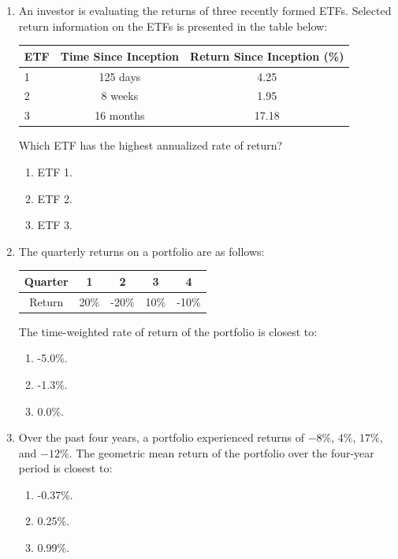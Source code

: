 \begin{enumerate}
	\item An investor is evaluating the returns of three recently formed ETFs. Selected return information on the ETFs is presented in the table below:
	      \begin{center}
	      \begin{tabular}{l  c  c}
		      \toprule
		      \textbf{ETF} & \textbf{Time Since Inception} & \textbf{Return Since Inception (\%)} \\
		      \midrule
		      1 & 125 days & 4.25 \\
		      2 & 8 weeks & 1.95 \\
		      3 & 16 months & 17.18 \\
		      \bottomrule
	      \end{tabular}
	      \end{center}
	      Which ETF has the highest annualized rate of return?
	      \begin{enumerate}[label=\Alph*.]
		      \item ETF 1.
		      \item ETF 2.
		      \item ETF 3.
	      \end{enumerate}

	\item The quarterly returns on a portfolio are as follows:
	      \begin{center}
	      \begin{tabular}{c  c  c  c  c}
		      \toprule
		      \textbf{Quarter} & \textbf{1} & \textbf{2} & \textbf{3} & \textbf{4} \\
		      \midrule
		      Return & 20\% & -20\% & 10\% & -10\% \\
		      \bottomrule
	      \end{tabular}
	      \end{center}
	      The time-weighted rate of return of the portfolio is closest to:
	      \begin{enumerate}[label=\Alph*.]
		      \item -5.0\%.
		      \item -1.3\%.
		      \item 0.0\%.
	      \end{enumerate}

	\item Over the past four years, a portfolio experienced returns of $-8\%$, $4\%$, $17\%$, and $-12\%$. The geometric mean return of the portfolio over the four-year period is closest to:
	      \begin{enumerate}[label=\Alph*.]
		      \item -0.37\%.
		      \item 0.25\%.
		      \item 0.99\%.
	      \end{enumerate}
\end{enumerate}


